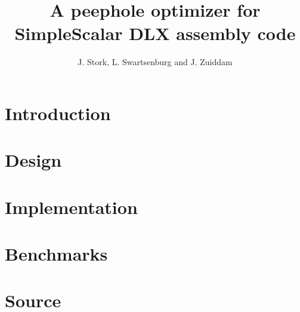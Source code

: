 \documentclass[a4paper]{article}
\title{A peephole optimizer for SimpleScalar DLX assembly code}
\author{J. Stork, L. Swartsenburg and J. Zuiddam}
\begin{document}
\maketitle
\section{Introduction}
\section{Design}
\section{Implementation}
\section{Benchmarks}
\appendix
\section{Source}
\end{document}

